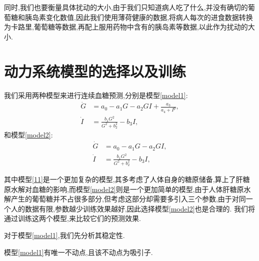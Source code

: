 同时,我们也要衡量具体扰动的大小,由于我们只知道病人吃了什么,并没有确切的葡萄糖和胰岛素变化数值,因此我们使用薄荷健康的数据,将病人每次的进食数据转换为卡路里,葡萄糖等数据,再配上服用药物中含有的胰岛素等数据,以此作为扰动的大小. 
\section{动力系统模型的选择以及训练}
我们采用两种模型来进行连续血糖预测,分别是模型\ref{model1}:
\begin{equation}\label{model1}
    \begin{aligned}
        \dot{G} & = a_0-a_1G-a_2GI+\frac{a_3}{a_4+I^p},  \\
        \dot{I} & = \frac{b_1 G^2}{G^2 + b_2^2} - b_3 I,
    \end{aligned}
\end{equation}
和模型\ref{model2}:
\begin{equation}\label{model2}
    \begin{aligned}
        \dot{G} & = a_0-a_1G-a_2GI,  \\
        \dot{I} & = \frac{b_1 G^2}{G^2 + b_2^2} - b_3 I,
    \end{aligned}
\end{equation}

其中模型\ref{11}是一个更加复杂的模型,其多考虑了人体自身的糖原储备,算上了肝糖原水解对血糖的影响,而模型\ref{model2}则是一个更加简单的模型,由于人体肝糖原水解产生的葡萄糖并不占很多部分,但考虑这部分却需要多引入三个参数,由于对同一个人的数据有限,参数越少训练效果越好,因此选择模型\ref{model2}也是合理的. 我们将通过训练这两个模型,来比较它们的预测效果. 

对于模型\ref{model1},我们先分析其稳定性. 
\begin{prop}
    模型\ref{model1}有唯一不动点,且该不动点为吸引子. 
\end{prop}

